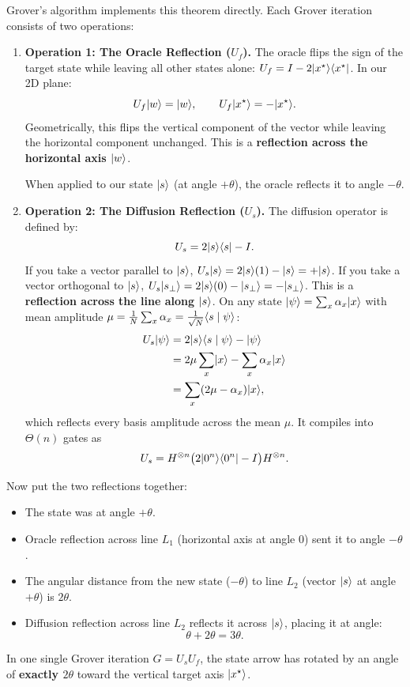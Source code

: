 Grover's algorithm implements this theorem directly. Each Grover iteration consists of
two operations:
\begin{enumerate}
  \item \textbf{Operation 1: The Oracle Reflection ($U_f$).}
  The oracle flips the sign of the target state while leaving all other states alone:
  $U_f = I - 2\lvert x^\star \rangle\langle x^\star \rvert$.
  In our 2D plane:
  \[
    U_f\lvert w \rangle = \lvert w \rangle, \qquad U_f\lvert x^\star \rangle = -\lvert x^\star \rangle.
  \]
  Geometrically, this flips the vertical component of the vector while leaving the
  horizontal component unchanged. This is a \textbf{reflection across the horizontal
  axis $\lvert w \rangle$}.
  
  When applied to our state $\lvert s \rangle$ (at angle $+\theta$), the oracle reflects it to
  angle $-\theta$.

  \item \textbf{Operation 2: The Diffusion Reflection ($U_s$).}
  The diffusion operator is defined by:
  \[
    U_s = 2\lvert s \rangle\langle s \rvert - I.
  \]
  If you take a vector parallel to $\lvert s \rangle$, $U_s\lvert s \rangle = 2\lvert s \rangle(1) - \lvert s \rangle = +\lvert s \rangle$.
  If you take a vector orthogonal to $\lvert s \rangle$, $U_s\lvert s_\perp \rangle = 2\lvert s \rangle(0) - \lvert s_\perp \rangle = -\lvert s_\perp \rangle$.
  This is a \textbf{reflection across the line along $\lvert s \rangle$}.
  On any state $\lvert \psi \rangle = \sum_x \alpha_x\lvert x \rangle$ with mean amplitude
  $\mu = \frac{1}{N}\sum_x \alpha_x = \frac{1}{\sqrt{N}}\langle s \mid \psi \rangle$:
  \[
    \begin{aligned}
    U_s\lvert \psi \rangle &= 2\lvert s \rangle\langle s \mid \psi \rangle - \lvert \psi \rangle \\
    &= 2\mu\sum_x \lvert x \rangle - \sum_x \alpha_x\lvert x \rangle \\
    &= \sum_x (2\mu - \alpha_x)\lvert x \rangle,
    \end{aligned}
  \]
  which reflects every basis amplitude across the mean $\mu$. It compiles into
  $\Theta(n)$ gates as
  \[
    U_s = H^{\otimes n}\bigl(2\lvert 0^n \rangle\langle 0^n \rvert - I\bigr)H^{\otimes n}.
  \]
\end{enumerate}

Now put the two reflections together:
\begin{itemize}
  \item The state was at angle $+\theta$.
  \item Oracle reflection across line $L_1$ (horizontal axis at angle $0$) sent it to angle $-\theta$.
  \item The angular distance from the new state ($-\theta$) to line $L_2$ (vector $\lvert s \rangle$ at angle $+\theta$) is $2\theta$.
  \item Diffusion reflection across line $L_2$ reflects it across $\lvert s \rangle$, placing it at angle:
  \[
    \theta + 2\theta = 3\theta.
  \]
\end{itemize}
In one single Grover iteration $G = U_s U_f$, the state arrow has rotated by an angle of
\textbf{exactly $2\theta$} toward the vertical target axis $\lvert x^\star \rangle$.

